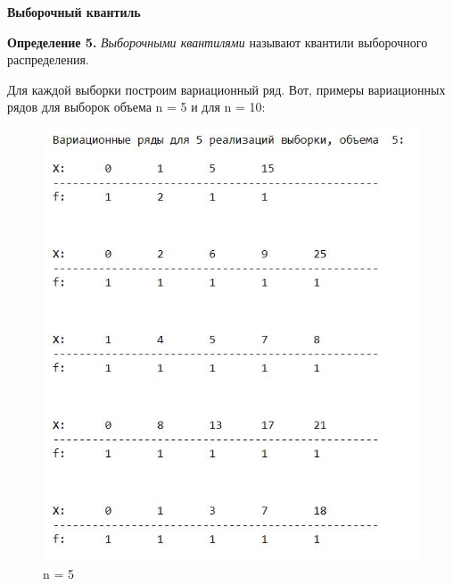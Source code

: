 \documentclass[a4paper,12pt, oneside]{book}
\begin{document}
\vspace{5mm}
\large{\textbf{Выборочный квантиль}}
\vspace{5mm}

\normalsize{\textbf{Определение 5.}} \textit{Выборочными квантилями } называют квантили выборочного распределения.


Для каждой выборки построим вариационный ряд. Вот, примеры вариационных рядов для выборок объема n = 5 и для n = 10:

\begin{figure}[h]
	\begin{center}
		\begin{minipage}[h]{0.4\linewidth}
			\includegraphics[width=1.5\linewidth]{var_ser_5.jpg}
			\caption{n = 5} %
		\end{minipage}
	\end{center}
\end{figure}


\vspace{5mm}
\end{document}
